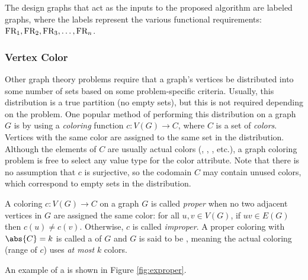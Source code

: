 The design graphs that act as the inputs to the proposed algorithm are labeled graphs, where the labels represent
the various functional requirements: \(\text{FR}_1,\text{FR}_2,\text{FR}_3,\ldots,\text{FR}_n\).

\subsubsection{Vertex Color}

Other graph theory problems require that a graph's vertices be distributed into some number of sets based on some
problem-specific criteria.  Usually, this distribution is a true partition (no empty sets), but this is not
required depending on the problem.  One popular method of performing this distribution on a graph \(G\) is by using
a \emph{coloring} function \(c:V(G)\to C\), where \(C\) is a set of \emph{colors}.  Vertices with the same color
are assigned to the same set in the distribution.  Although the elements of \(C\) are usually actual colors
(, , , etc.), a graph coloring problem is free to select any value type for
the color attribute.  Note that there is no assumption that \(c\) is surjective, so the codomain \(C\) may contain
unused colors, which correspond to empty sets in the distribution.

A coloring \(c:V(G)\to C\) on a graph \(G\) is called \emph{proper} when no two adjacent vertices in \(G\) are
assigned the same color: for all \(u,v\in V(G)\), if \(uv\in E(G)\) then \(c(u)\ne c(v)\).  Otherwise, \(c\) is
called \emph{improper}.  A proper coloring with \(\abs{C}=k\) is called a \emph{} of \(G\) and \(G\) is
said to be \emph{}, meaning the actual coloring (range of \(c\)) uses \emph{at most} \(k\) colors.

An example of a  is shown in Figure \ref{fig:exproper}.

